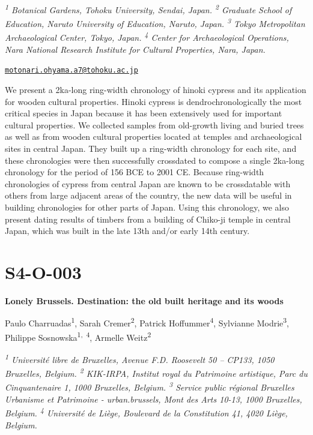 \documentclass[
]{book}
\begin{document}
\emph{\textsuperscript{1} Botanical Gardens, Tohoku University, Sendai, Japan. \textsuperscript{2} Graduate School of Education, Naruto University of Education, Naruto, Japan. \textsuperscript{3} Tokyo Metropolitan Archaeological Center, Tokyo, Japan. \textsuperscript{4} Center for Archaeological Operations, Nara National Research Institute for Cultural Properties, Nara, Japan.}

\href{mailto:motonari.ohyama.a7@tohoku.ac.jp}{\nolinkurl{motonari.ohyama.a7@tohoku.ac.jp}}

We present a 2ka-long ring-width chronology of hinoki cypress and its application for wooden cultural properties. Hinoki cypress is dendrochronologically the most critical species in Japan because it has been extensively used for important cultural properties. We collected samples from old-growth living and buried trees as well as from wooden cultural properties located at temples and archaeological sites in central Japan. They built up a ring-width chronology for each site, and these chronologies were then successfully crossdated to compose a single 2ka-long chronology for the period of 156 BCE to 2001 CE. Because ring-width chronologies of cypress from central Japan are known to be crossdatable with others from large adjacent areas of the country, the new data will be useful in building chronologies for other parts of Japan. Using this chronology, we also present dating results of timbers from a building of Chiko-ji temple in central Japan, which was built in the late 13th and/or early 14th century.

\hypertarget{s4-o-003}{%
\section*{S4-O-003}\label{s4-o-003}}

\textbf{Lonely Brussels. Destination: the old built heritage and its woods}

Paulo Charruadas\textsuperscript{1}, Sarah Cremer\textsuperscript{2}, Patrick Hoffummer\textsuperscript{4}, Sylvianne Modrie\textsuperscript{3}, Philippe Sosnowska\textsuperscript{1,~4}, Armelle Weitz\textsuperscript{2}

\emph{\textsuperscript{1} Université libre de Bruxelles, Avenue F.D. Roosevelt 50 -- CP133, 1050 Bruxelles, Belgium. \textsuperscript{2} KIK-IRPA, Institut royal du Patrimoine artistique, Parc du Cinquantenaire 1, 1000 Bruxelles, Belgium. \textsuperscript{3} Service public régional Bruxelles Urbanisme et Patrimoine - urban.brussels, Mont des Arts 10-13, 1000 Bruxelles, Belgium. \textsuperscript{4} Université de Liège, Boulevard de la Constitution 41, 4020 Liège, Belgium.}
\end{document}
